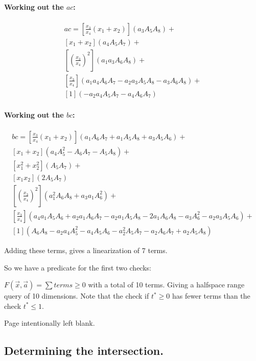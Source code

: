 \documentclass{article}
\begin{document}
\paragraph*{Working out the $ac$:}

\begin{align*}
    ac = 
     \left[\frac{x_3}{x_4}(x_1 + x_2)\right](a_3 A_5 A_8) + \\
     [x_1 + x_2](a_4 A_5 A_7) +\\
    \left [\left( \frac{x_3}{x_4} \right)^2 \right](a_1 a_3 A_6 A_8) +\\
      \left[\frac{x_3}{x_4}\right](a_1 a_4 A_6 A_7- a_2 a_3 A_5 A_8- a_3 A_6 A_8) +\\
     [1](- a_2 a_4 A_5 A_7 - a_4 A_6 A_7)
\end{align*}

\paragraph{Working out the $bc$:}

\begin{align*}
     bc =
     \left[\frac{x_3}{x_4}(x_1 + x_2)\right](a_1 A_6 A_7 + a_1 A_5 A_8 + a_3 A_5 A_6) + \\
     [x_1 + x_2](  a_4 A_5^2- A_6 A_7- A_5 A_8) +\\
    [x_1^2 + x_2^2](A_5 A_7) + \\
    [x_1x_2](2 A_5 A_7) \\
    \left [\left( \frac{x_3}{x_4} \right)^2 \right](a_1^2 A_6 A_8+ a_3 a_1 A_6^2 ) + \\
    \left[\frac{x_3}{x_4}\right](  a_4 a_1 A_5 A_6+ a_2 a_1 A_6 A_7- a_2 a_1 A_5 A_8- 2 a_1 A_6 A_8- a_3 A_6^2- a_2 a_3 A_5 A_6) +\\  [1](A_6 A_8- a_2 a_4 A_5^2- a_4 A_5 A_6 - a_2^2 A_5 A_7 - a_2 A_6 A_7 + a_2 A_5 A_8)
\end{align*}

Adding these terms, gives a linearization of 7 terms.



So we have a predicate for the first two checks:

$F(\vec{x}, \vec{a}) = \sum terms \ge 0$ with a total of 10 terms. Giving a halfspace range query of 10 dimensions. 
Note that the check if $t^* \ge 0$ has fewer terms than the check $t^* \le 1$.


\newpage

Page intentionally left blank.
\newpage


\subsection{Determining the intersection.}
\end{document}
